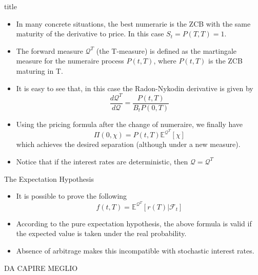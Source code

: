 \documentclass{beamer}
\begin{document}
\begin{frame}{title}
\begin{itemize}
\item In many concrete situations, the best numerarie is the ZCB with the same maturity of the derivative to price.
In this case $S_t = P(T,T)=1$.
\item The forward measure $\mathcal{Q}^T$ (the T-measure) is defined as the martingale measure for the numeraire process $P(t,T)$, where $P(t,T)$ is the ZCB maturing in T.
\item It is easy to see that, in this case the Radon-Nykodin derivative is given by
\begin{equation}
\frac{d\mathcal{Q}^T}{d\mathcal{Q}} = \frac{P(t,T)}{B_t P(0,T)} 
\end{equation}
\item Using the pricing formula after the change of numeraire, we finally have
\begin{equation}
\Pi(0,\chi)=P(t,T)\mathbb{E}^{\mathcal{Q}^T}[\chi]
\end{equation}
which achieves the desired separation (although under a new measure).
\item Notice that if the interest rates are deterministic, then $\mathcal{Q} = \mathcal{Q}^T$
\end{itemize}
\end{frame}


\begin{frame}{The Expectation Hypothesis}
\begin{itemize}
\item It is possible to prove the following
\begin{equation}
f(t, T) = \mathbb{E}^{\mathcal{Q}^T}[r(T)|\mathcal{F}_t]
\end{equation}
\item According to the pure expectation hypothesis, the above formula is valid if the expected value is taken under the real probability.
\item Absence of arbitrage makes this incompatible with stochastic interest rates.
\end{itemize}
DA CAPIRE MEGLIO
\end{frame}
\end{document}
